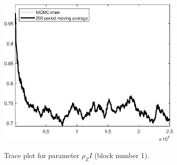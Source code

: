\begin{figure}[H]
\centering
  \includegraphics[width=0.8\textwidth]{BRS/graphs/TracePlot_rho_ZI_blck_1}\\
    \caption{Trace plot for parameter ${\rho_ZI}$ (block number 1).}
\end{figure}
